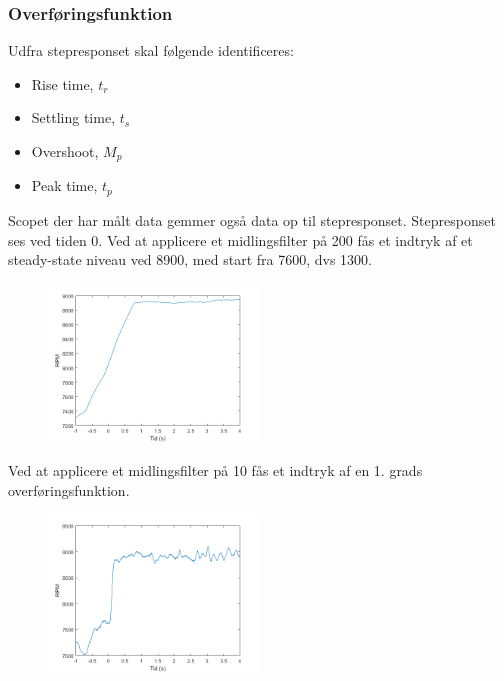 \subsubsection{Overføringsfunktion}
\label{sec:overforingsfunktion}
Udfra stepresponset skal følgende identificeres:

\begin{itemize}
\item Rise time, $t_r$
\item Settling time, $t_s$
\item Overshoot, $M_p$
\item Peak time, $t_p$
\end{itemize}

Scopet der har målt data gemmer også data op til stepresponset. Stepresponset ses ved tiden 0.
Ved at applicere et midlingsfilter på 200 fås et indtryk af et steady-state niveau ved 8900, med start fra 7600, dvs 1300. 

\begin{figure}[h]
  \centering
  \includegraphics[width=0.5\textwidth]{mo4.png}
  \caption{}
  \label{fig:mo4}
\end{figure}

Ved at applicere et midlingsfilter på 10 fås et indtryk af en 1. grads overføringsfunktion.

\begin{figure}[h]
  \centering
  \includegraphics[width=0.5\textwidth]{mo5.png}
  \caption{}
  \label{fig:mo5}
\end{figure}

